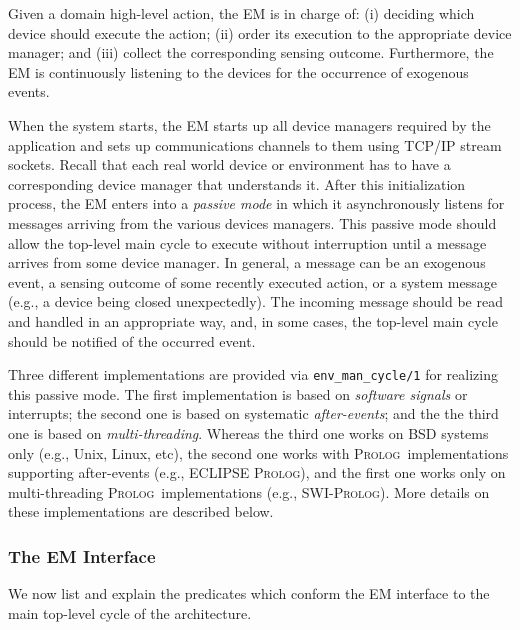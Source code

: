\documentclass[11pt]{article}
\newcommand{\Prolog}{\mbox{\textsc{Prolog}}}
\begin{document}
Given a domain high-level action, the EM is in charge of: (i) deciding which
device should execute the action; (ii) order its execution to the appropriate
device manager; and (iii) collect the corresponding sensing outcome.  
%
Furthermore, the EM is continuously listening to the devices for the
occurrence of exogenous events.

When the system starts, the EM starts up all device managers required by the
application and sets up communications channels to them using TCP/IP stream
sockets. Recall that each real world device or environment has to have a
corresponding device manager that understands it.
%
After this initialization process, the EM enters into a \textit{passive mode}
in which it asynchronously listens for messages arriving from the various
devices managers. This passive mode should allow the top-level main cycle to
execute without interruption until a message arrives from some device manager.
%
In general, a message can be an exogenous event, a sensing outcome of some
recently executed action, or a system message (e.g., a device being
closed unexpectedly).  The incoming message should be read and handled in an
appropriate way, and, in some cases, the top-level main cycle should be
notified of the occurred event.

Three different implementations are provided via \texttt{env\_man\_cycle/1} for
realizing this passive mode. The first implementation is based on \emph{software
signals} or interrupts; the second one is based on systematic
\textit{after-events}; and the the third one is based on \emph{multi-threading}.
Whereas the third one works on BSD systems only (e.g., Unix, Linux, etc),
the second one works with \Prolog\ implementations supporting after-events
(e.g., ECLIPSE \Prolog), and the first one works only on multi-threading
\Prolog\ implementations (e.g., SWI-\Prolog). More details on these
implementations are described below.

\subsubsection{The EM Interface}

We now list and explain the predicates which conform the EM interface to 
the main top-level cycle of the architecture.
\end{document}
